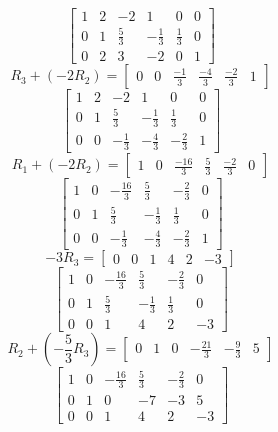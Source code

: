 \documentclass[11pt]{article}
\begin{document}
\[
    \left[
    \begin{array}{ccc|ccc}
        1 & 2 & -2 & 1 & 0 & 0 \\
        0 & 1 & \frac{5}{3} & -\frac{1}{3} & \frac{1}{3} & 0 \\
        0 & 2 & 3 & -2 & 0 & 1
    \end{array}
    \right]
\]
\[
    R_3 + (-2R_2) = 
    \left[
    \begin{array}{ccc|ccc}
        0 & 0 & \frac{-1}{3} & \frac{-4}{3} & \frac{-2}{3} & 1
    \end{array}
    \right]
\]
\[
    \left[
    \begin{array}{ccc|ccc}
        1 & 2 & -2 & 1 & 0 & 0 \\
        0 & 1 & \frac{5}{3} & -\frac{1}{3} & \frac{1}{3} & 0 \\
        0 & 0 & -\frac{1}{3} & -\frac{4}{3} & -\frac{2}{3} & 1
    \end{array}
    \right]
\]
\[
    R_1 + (-2R_2) = 
    \left[
    \begin{array}{ccc|ccc}
        1 & 0 & \frac{-16}{3} & \frac{5}{3} & \frac{-2}{3} & 0
    \end{array}
    \right]
\]
\[
    \left[
    \begin{array}{ccc|ccc}
        1 & 0 & -\frac{16}{3} & \frac{5}{3} & -\frac{2}{3} & 0 \\
        0 & 1 & \frac{5}{3} & -\frac{1}{3} & \frac{1}{3} & 0 \\
        0 & 0 & -\frac{1}{3} & -\frac{4}{3} & -\frac{2}{3} & 1
    \end{array}
    \right]
\]
\[
    -3R_3 = 
    \left[
    \begin{array}{ccc|ccc}
        0 & 0 & 1 & 4 & 2 & -3
    \end{array}
    \right]
\]
\[
    \left[
    \begin{array}{ccc|ccc}
        1 & 0 & -\frac{16}{3} & \frac{5}{3} & -\frac{2}{3} & 0 \\
        0 & 1 & \frac{5}{3} & -\frac{1}{3} & \frac{1}{3} & 0 \\
        0 & 0 & 1 & 4 & 2 & -3
    \end{array}
    \right]
\]
\[
    R_2 + (-\frac{5}{3}R_3) = 
    \left[
    \begin{array}{ccc|ccc}
        0 & 1 & 0 & -\frac{21}{3} & -\frac{9}{3} & 5
    \end{array}
    \right]
\]
\[
    \left[
    \begin{array}{ccc|ccc}
        1 & 0 & -\frac{16}{3} & \frac{5}{3} & -\frac{2}{3} & 0 \\
        0 & 1 & 0 & -7 & -3 & 5 \\
        0 & 0 & 1 & 4 & 2 & -3
    \end{array}
    \right]
\]
\end{document}
